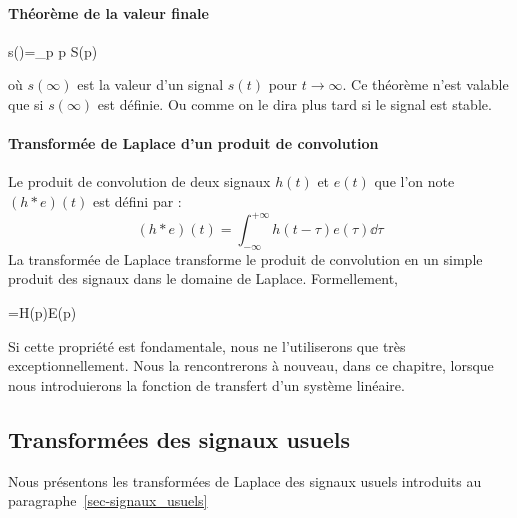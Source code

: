\paragraph{Théorème de la valeur finale}
\begin{bequation}
    s(\infty)=\lim\limits_{p} p S(p)
\end{bequation}
où $s(\infty)$ est la valeur d'un signal $s(t)$ pour $t\to\infty$.
Ce théorème n'est valable que si $s(\infty)$ est définie. Ou comme on le 
dira plus tard si le signal est stable.
\paragraph{Transformée de Laplace d'un produit de convolution}
Le produit de convolution de deux signaux $h(t)$ et $e(t)$ que l'on 
note $(h*e)(t)$ est défini par :
\[
    (h*e)(t)=\int_{-\infty}^{+\infty}h(t-\tau)e(\tau)\dd{\tau}
\]
La transformée de Laplace transforme le produit de convolution en un simple
produit des signaux dans le domaine de Laplace. Formellement,
\begin{bequation}
    =H(p)E(p)
\end{bequation}
Si cette propriété est fondamentale, nous ne l'utiliserons 
que très exceptionnellement. Nous la rencontrerons à nouveau, 
dans ce chapitre, lorsque nous introduierons la fonction de 
transfert d'un système linéaire.
\subsection{Transformées des signaux usuels}
Nous présentons les transformées de Laplace des signaux usuels introduits
au paragraphe~\ref{sec-signaux_usuels}
